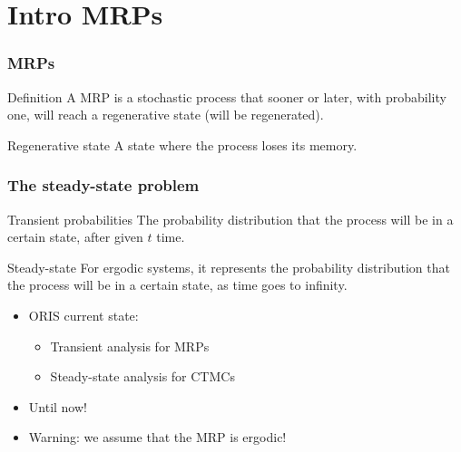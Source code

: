 \begin{frame}[plain]
  \titlepage
\end{frame}

\section{Intro \acfp{MRP}}
\begin{frame}
  \frametitle{\acfp{MRP}}
  \begin{block}{Definition}
    A \acf{MRP} is a stochastic process that sooner or later, with
    probability one, will
    reach a \alert{regenerative} state (will be regenerated).
  \end{block}
  \pause
  \begin{block}{Regenerative state}
    A state where the process loses its \alert{memory}. 
  \end{block}
  \pause
  \begin{center}    
  \end{center}
\end{frame}

\begin{frame}
  \frametitle{The steady-state problem}
  \pause
  \begin{block}{Transient probabilities}
    The \alert{probability} distribution that the process will be in a certain
    state, after given $t$ \alert{time}.
  \end{block}
  \pause
  \begin{block}{Steady-state}
    For ergodic systems, it represents the \alert{probability} distribution
    that the
    process will be in a certain state, as time goes to \alert{infinity}.
  \end{block}
  \pause
  \begin{itemize}
  \item ORIS current state:
    \begin{itemize}
    \item \alert{Transient} analysis for \acfp{MRP}
    \item \alert{Steady-state} analysis for \acfp{CTMC}
    \end{itemize}
    \pause
  \item Until now! 
    \pause
  \item \alert{Warning:} we assume that the \acs{MRP} is \alert{ergodic}!
  \end{itemize}
\end{frame}

